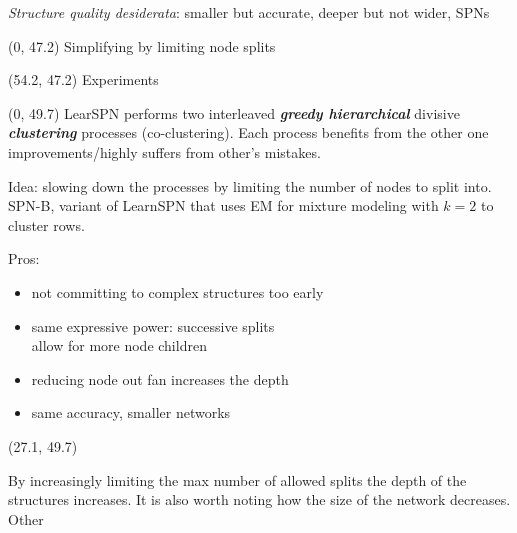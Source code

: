\documentclass[final]{beamer}
\begin{document}
\begin{frame}{}
\begin{textblock}{25.7}
    \emph{Structure quality desiderata}: smaller but accurate, deeper but not
    wider, SPNs

  \end{textblock}
  
  
  \begin{textblock}{80}(0, 47.2)
    Simplifying by limiting node splits
  \end{textblock}

  \begin{textblock}{20}(54.2, 47.2)
    Experiments
  \end{textblock}
  
  \begin{textblock}{25.7}(0, 49.7)
    \footnotesize
    \textsf{LearSPN} performs two interleaved \textbf{\emph{greedy
        hierarchical}} divisive \textbf{\emph{clustering}}
    processes (co-clustering). Each process benefits from the other one improvements/highly suffers
    from other's mistakes.\par\bigskip

    Idea: slowing down the processes by limiting the number of
    nodes to split into. \textsf{SPN-B}, variant of \textsf{LearnSPN} that uses EM
    for mixture modeling with
    $k=2$ to cluster rows.\par\bigskip

    Pros:
    \begin{itemize}
    \item not committing to complex structures too early  
    \item same expressive power: successive splits\\ allow for more node children
    \item reducing node out fan increases the depth
    \item same accuracy, smaller networks
    \end{itemize}
  \end{textblock}
  
  \begin{textblock}{25.7}(27.1, 49.7)

    \footnotesize
    By increasingly limiting the max number of allowed splits the depth of the
    structures increases. It is also worth noting how the size of the
    network decreases. 
    Other
    

\end{textblock}
\end{frame}
\end{document}
